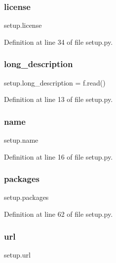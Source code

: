 \subsubsection{\texorpdfstring{license}{license}}
{\footnotesize\ttfamily setup.\+license}



Definition at line 34 of file setup.\+py.

\mbox{\label{namespacesetup_a4cda9dbfb952875376a0749fe08a5bde}} 
\subsubsection{\texorpdfstring{long\+\_\+description}{long\_description}}
{\footnotesize\ttfamily setup.\+long\+\_\+description = f.\+read()}



Definition at line 13 of file setup.\+py.

\mbox{\label{namespacesetup_ab3a7a0638d76a01367c5bc3cc699447f}} 
\subsubsection{\texorpdfstring{name}{name}}
{\footnotesize\ttfamily setup.\+name}



Definition at line 16 of file setup.\+py.

\mbox{\label{namespacesetup_aff2375a361fd5865c77bd9aa093be747}} 
\subsubsection{\texorpdfstring{packages}{packages}}
{\footnotesize\ttfamily setup.\+packages}



Definition at line 62 of file setup.\+py.

\mbox{\label{namespacesetup_afc13124aa5c0124e84e1d965e3f4b0fb}} 
\subsubsection{\texorpdfstring{url}{url}}
{\footnotesize\ttfamily setup.\+url}



